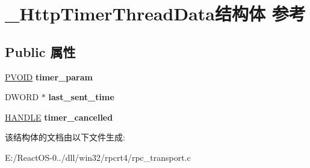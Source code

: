 \hypertarget{struct___http_timer_thread_data}{}\section{\+\_\+\+Http\+Timer\+Thread\+Data结构体 参考}
\label{struct___http_timer_thread_data}
\subsection*{Public 属性}
\begin{DoxyCompactItemize}
\item 
\mbox{\label{struct___http_timer_thread_data_a2c1616e8c496a471c4462aa28329e90c}} 
\hyperlink{interfacevoid}{P\+V\+O\+ID} {\bfseries timer\+\_\+param}
\item 
\mbox{\label{struct___http_timer_thread_data_aa9571154a6c1026e82e8ae7400521911}} 
D\+W\+O\+RD $\ast$ {\bfseries last\+\_\+sent\+\_\+time}
\item 
\mbox{\label{struct___http_timer_thread_data_a333b41fd6d3c0733fe0b94bcfba57070}} 
\hyperlink{interfacevoid}{H\+A\+N\+D\+LE} {\bfseries timer\+\_\+cancelled}
\end{DoxyCompactItemize}


该结构体的文档由以下文件生成\+:\begin{DoxyCompactItemize}
\item 
E\+:/\+React\+O\+S-\/0../dll/win32/rpcrt4/rpc\+\_\+transport.\+c\end{DoxyCompactItemize}
